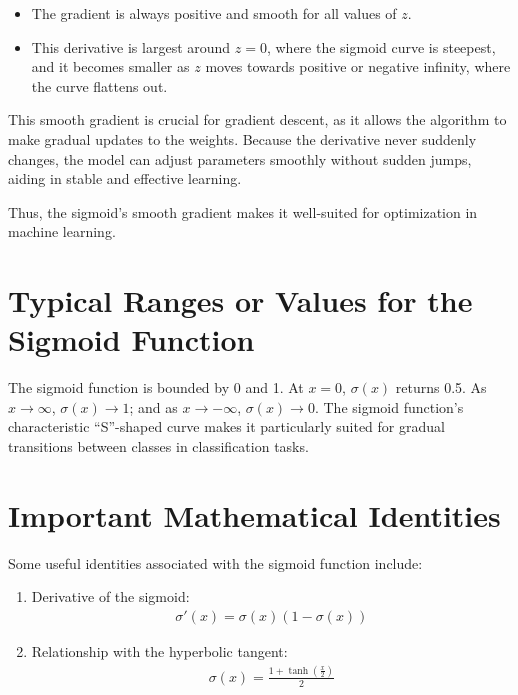 \documentclass[
  12 pt,
  a4paper,
]{book}
\providecommand{\tightlist}{%
  \setlength{\itemsep}{0pt}\setlength{\parskip}{0pt}}
\numberwithin{equation}{section}
\theoremstyle{plain}      %
\theoremstyle{definition} %
\theoremstyle{remark}     %
\theoremstyle{note}         %
\begin{document}
\begin{itemize}
\tightlist
\item
  The gradient is always positive and smooth for all values of \(z\).
\item
  This derivative is largest around \(z = 0\), where the sigmoid curve
  is steepest, and it becomes smaller as \(z\) moves towards positive or
  negative infinity, where the curve flattens out.
\end{itemize}

This smooth gradient is crucial for gradient descent, as it allows the
algorithm to make gradual updates to the weights. Because the derivative
never suddenly changes, the model can adjust parameters smoothly without
sudden jumps, aiding in stable and effective learning.

Thus, the sigmoid's smooth gradient makes it well-suited for
optimization in machine learning.

\hypertarget{typical-ranges-or-values-for-the-sigmoid-function}{%
\section{Typical Ranges or Values for the Sigmoid
Function}\label{typical-ranges-or-values-for-the-sigmoid-function}}

The sigmoid function is bounded by 0 and 1. At \(x = 0\), \(\sigma(x)\)
returns 0.5. As \(x \to \infty\), \(\sigma(x) \to 1\); and as
\(x \to -\infty\), \(\sigma(x) \to 0\). The sigmoid function's
characteristic ``S''-shaped curve makes it particularly suited for
gradual transitions between classes in classification tasks.

\hypertarget{important-mathematical-identities}{%
\section{Important Mathematical
Identities}\label{important-mathematical-identities}}

Some useful identities associated with the sigmoid function include:

\begin{enumerate}
\def\labelenumi{\arabic{enumi}.}
\item
  Derivative of the sigmoid: \begin{align}
  \sigma'(x) = \sigma(x)(1 - \sigma(x))
  \end{align}
\item
  Relationship with the hyperbolic tangent: \begin{align}
  \sigma(x) = \frac{1 + \tanh\left(\frac{x}{2}\right)}{2}
  \end{align}
\end{enumerate}
\end{document}
